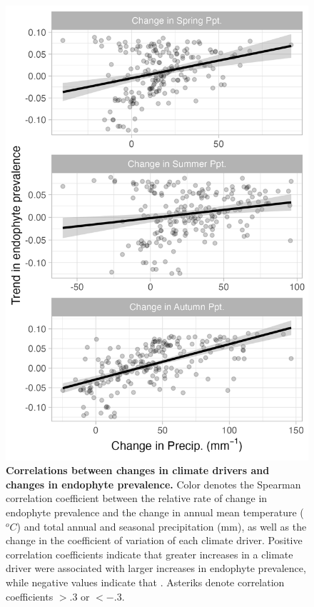\documentclass[11pt]{article}
\begin{document}
\begin{figure}[H]
	\centering
	\includegraphics[width = .7\linewidth]{ppt_regression_plot_ESA.png}
	\caption{\textbf{Correlations between changes in climate drivers and changes in endophyte prevalence.} Color denotes the Spearman correlation coefficient between the relative rate of change in endophyte prevalence and the change in annual mean temperature ($^oC$) and total annual and seasonal precipitation (mm), as well as the change in the coefficient of variation of each climate driver. Positive correlation coefficients indicate that greater increases in a climate driver were associated with larger increases in endophyte prevalence, while negative values indicate that . Asteriks denote correlation coefficients $> .3$ or $< -.3$.}
\end{figure}
\end{document}
